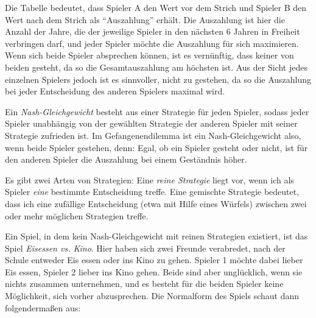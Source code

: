 \documentclass{zusammenfassung}
\begin{document}
Die Tabelle bedeutet, dass Spieler A den Wert vor dem Strich und Spieler B den Wert nach dem Strich als "`Auszahlung"' erhält. Die
Auszahlung ist hier die Anzahl der Jahre, die der jeweilige Spieler in den nächsten 6 Jahren in Freiheit verbringen darf, und
jeder Spieler möchte die Auszahlung für sich maximieren. Wenn sich beide Spieler absprechen können, ist es vernünftig, dass keiner
von beiden gesteht, da so die Gesamtauszahlung am höchsten ist. Aus der Sicht jedes einzelnen Spielers jedoch ist es sinnvoller,
nicht zu gestehen, da so die Auszahlung bei jeder Entscheidung des anderen Spielers maximal wird.

Ein \emph{Nash-Gleichgewicht} besteht aus einer Strategie für jeden Spieler, sodass jeder Spieler unabhängig von der gewählten
Strategie der anderen Spieler mit seiner Strategie zufrieden ist. Im Gefangenendilemma ist ein Nash-Gleichgewicht also, wenn beide
Spieler gestehen, denn: Egal, ob ein Spieler gesteht oder nicht, ist für den anderen Spieler die Auszahlung bei einem Geständnis
höher.

Es gibt zwei Arten von Strategien: Eine \emph{reine Strategie} liegt vor, wenn ich als Spieler \emph{eine} bestimmte Entscheidung
treffe. Eine gemischte Strategie bedeutet, dass ich eine zufällige Entscheidung (etwa mit Hilfe eines Würfels) zwischen zwei oder
mehr möglichen Strategien treffe.

Ein Spiel, in dem kein Nash-Gleichgewicht mit reinen Strategien existiert, ist das Spiel \emph{Eisessen vs. Kino}. Hier haben sich
zwei Freunde verabredet, nach der Schule entweder Eis essen oder ins Kino zu gehen. Spieler 1 möchte dabei lieber Eis essen,
Spieler 2 lieber ins Kino gehen. Beide sind aber unglücklich, wenn sie nichts zusammen unternehmen, und es besteht für die beiden
Spieler keine Möglichkeit, sich vorher abzusprechen. Die Normalform des Spiels schaut dann folgendermaßen aus:

\begin{center}
\end{center}
\end{document}
